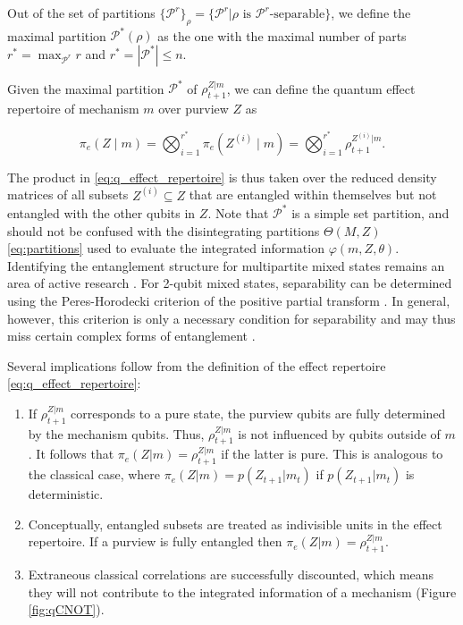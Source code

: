 \documentclass[preprints, article, accept, pdftex, moreauthors, letterpaper]{Definitions/mdpi}
\renewcommand{\=}[1]{\stackrel{#1}{=}} %
\newcommand{\p}{\theta} %
\newcommand{\Part}{\Theta}
\renewcommand{\*}{\otimes}%
\begin{document}
\begin{Definition}
\label{def:entanglement_partition}
Out of the set of partitions $\{\mathcal{P}^r\}_\rho = \{\mathcal{P}^r\vert \rho \text{ is }\mathcal{P}^r\text{-separable}\}$, we define the maximal partition $\mathcal{P}^*(\rho)$ as the one with the maximal number of parts $r^* = \max_{\mathcal{P}^r} r$ and $r^* = |\mathcal{P}^*| \leq n$.
\end{Definition}

\begin{Definition}
\label{def:q_effect_repertoire}
Given the maximal partition $\mathcal{P^*}$ of $\rho^{Z|m}_{t+1}$, we can define the quantum effect repertoire of mechanism $m$ over purview $Z$ as

\begin{equation}
\label{eq:q_effect_repertoire}
\pi_e(Z \mid m) = \bigotimes_{i=1}^{r^*} \pi_e(Z^{(i)} \mid m) = \bigotimes_{i=1}^{r^*} \rho^{Z^{(i)}|m}_{t+1}.
\end{equation}
\end{Definition}
%
The product in \eqref{eq:q_effect_repertoire} is thus taken over the reduced density matrices of all subsets $Z^{(i)} \subseteq Z$ that are entangled within themselves but not entangled with the other qubits in $Z$.
Note that $\mathcal{P}^*$ is a simple set partition, and should not be confused with the disintegrating partitions $\Part(M,Z)$ \eqref{eq:partitions} used to evaluate the integrated information $\varphi(m,Z,\p)$. Identifying the entanglement structure for multipartite mixed states remains an area of active research \cite{Guhne2009, Li2018, Skorobagatko2021}. For 2-qubit mixed states, separability can be determined using the Peres-Horodecki criterion of the positive partial transform \cite{Peres1996, Horodecki1996}. In general, however, this criterion is only a necessary condition for separability \cite{Horodecki1996} and may thus miss certain complex forms of entanglement \cite{Bennett1999}. 

Several implications follow from the definition of the effect repertoire \eqref{eq:q_effect_repertoire}:
\begin{enumerate}
    \item If $\rho^{Z|m}_{t+1}$ corresponds to a pure state, the purview qubits are fully determined by the mechanism qubits. Thus, $\rho^{Z|m}_{t+1}$ is not influenced by qubits outside of $m$. It follows that $\pi_e(Z|m) = \rho^{Z|m}_{t+1}$ if the latter is pure. This is analogous to the classical case, where $\pi_e(Z|m) = p(Z_{t+1}|m_t)$ if $p(Z_{t+1}|m_t)$ is deterministic. 
    \item Conceptually, entangled subsets are treated as indivisible units in the effect repertoire. If a purview is fully entangled then $\pi_e(Z|m) = \rho^{Z|m}_{t+1}$. 
    \item Extraneous classical correlations are successfully discounted, which means they will not contribute to the integrated information of a mechanism (Figure \ref{fig:qCNOT}).
\end{enumerate}
\end{document}
